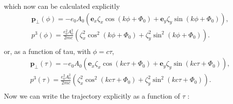 which now can be calculated explicitly
\begin{align}
   & \mathbf{p}_{\perp}(\phi)=-e_{0} A_{0}\left(\mathbf{e}_{x} \zeta_{x} \cos \left(k \phi+\Phi_{0}\right)+\mathbf{e}_{y} \zeta_{y} \sin \left(k \phi+\Phi_{0}\right)\right),  \label{II.2.4.17} \\
   & p^{3}(\phi)=\frac{e_{0}^{2} A_{0}^{2}}{2 m c}\left(\zeta_{x}^{2} \cos ^{2}\left(k \phi+\Phi_{0}\right)+\zeta_{y}^{2} \sin ^{2}\left(k \phi+\Phi_{0}\right)\right) . \label{II.2.4.18}       \\
\end{align}
or, as a function of tau, with $\phi=c \tau$,
\begin{align}
   & \mathbf{p}_{\perp}(\tau)=-e_{0} A_{0}\left(\mathbf{e}_{x} \zeta_{x} \cos \left(k c \tau+\Phi_{0}\right)+\mathbf{e}_{y} \zeta_{y} \sin \left(k c \tau+\Phi_{0}\right)\right),  \label{II.2.4.19} \\
   & p^{3}(\tau)=\frac{e_{0}^{2} A_{0}^{2}}{2 m c}\left(\zeta_{x}^{2} \cos ^{2}\left(k c \tau+\Phi_{0}\right)+\zeta_{y}^{2} \sin ^{2}\left(k c \tau+\Phi_{0}\right)\right) . \label{II.2.4.20}       \\
\end{align}
Now we can write the trajectory explicitly as a function of $\tau$ :
